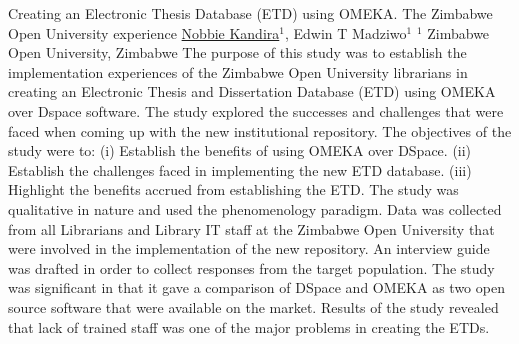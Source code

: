 
    \begin{abstract_online}{Creating an Electronic Thesis Database (ETD) using OMEKA. The Zimbabwe Open University experience}{%
        \underline{Nobbie Kandira}$^{1}$, Edwin T Madziwo$^{1}$}{%
        }{%
        $^1$ Zimbabwe Open University, Zimbabwe}
        The purpose of this study was to establish the implementation experiences of the Zimbabwe Open University librarians in creating an Electronic Thesis and Dissertation Database (ETD) using OMEKA over Dspace software. The study explored the successes and challenges that were faced when coming up with the new institutional repository. The objectives of the study were to: (i) Establish the benefits of using OMEKA over DSpace. (ii) Establish the challenges faced in implementing the new ETD database. (iii) Highlight the benefits accrued from establishing the ETD. The study was qualitative in nature and used the phenomenology paradigm. Data was collected from all Librarians and Library IT staff at the Zimbabwe Open University that were involved in the implementation of the new repository. An interview guide was drafted in order to collect responses from the target population. The study was significant in that it gave a comparison of DSpace and OMEKA as two open source software that were available on the market. Results of the study revealed that lack of trained staff was one of the major problems in creating the ETDs.
    
    \end{abstract_online}
    
